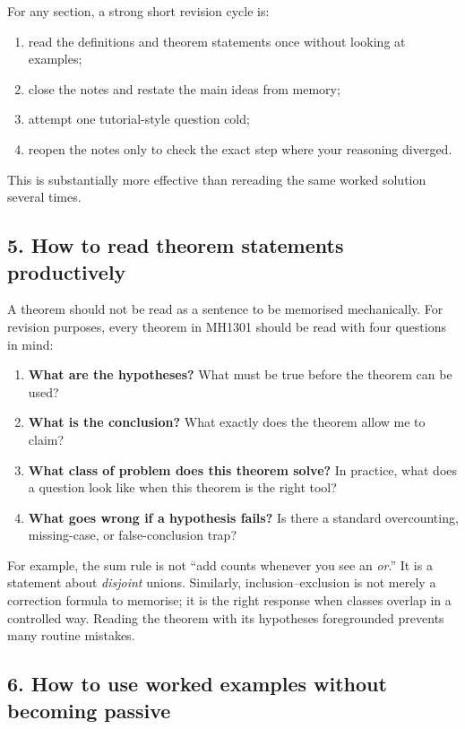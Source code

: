 \documentclass[12pt]{article}
\begin{document}
\begin{examtip}[title={A productive revision cycle}]
For any section, a strong short revision cycle is:
\begin{enumerate}[leftmargin=*]
    \item read the definitions and theorem statements once without looking at examples;
    \item close the notes and restate the main ideas from memory;
    \item attempt one tutorial-style question cold;
    \item reopen the notes only to check the exact step where your reasoning diverged.
\end{enumerate}
This is substantially more effective than rereading the same worked solution several times.
\end{examtip}

\subsection*{5. How to read theorem statements productively}

A theorem should not be read as a sentence to be memorised mechanically. For revision purposes, every theorem in MH1301 should be read with four questions in mind:
\begin{enumerate}[leftmargin=*]
    \item \textbf{What are the hypotheses?} What must be true before the theorem can be used?
    \item \textbf{What is the conclusion?} What exactly does the theorem allow me to claim?
    \item \textbf{What class of problem does this theorem solve?} In practice, what does a question look like when this theorem is the right tool?
    \item \textbf{What goes wrong if a hypothesis fails?} Is there a standard overcounting, missing-case, or false-conclusion trap?
\end{enumerate}

For example, the sum rule is not ``add counts whenever you see an \emph{or}.'' It is a statement about \emph{disjoint} unions. Similarly, inclusion--exclusion is not merely a correction formula to memorise; it is the right response when classes overlap in a controlled way. Reading the theorem with its hypotheses foregrounded prevents many routine mistakes.

\subsection*{6. How to use worked examples without becoming passive}
\end{document}
